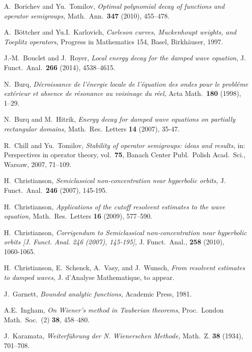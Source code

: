 \documentclass[11pt]{amsart}
\theoremstyle{definition}
\theoremstyle{remark}
\numberwithin{equation}{section}
\begin{document}
\begin{thebibliography}{100}
 A.~Borichev and Yu.~Tomilov, \emph{Optimal polynomial decay of functions and operator semigroups,} Math.\ Ann.\ \textbf{347} (2010), 455--478.

 A.~B\"ottcher and Yu.I.~Karlovich, \emph{Carleson curves, Muckenhoupt weights, and Toeplitz operators,}
Progress in Mathematics 154, Basel, Birkh\"auser, 1997.

 J.-M.~Bouclet and J.~Royer, \emph{Local energy decay for the damped wave equation}, J. Funct.\ Anal.\ \textbf{266} (2014), 4538--4615.

 N.~Burq, \emph{D\'ecroissance de l'\'energie locale de l'\'equation des ondes pour le probl\'eme ext\'erieur et absence de r\'esonance
au voisinage du r\'eel,} Acta Math.\ \textbf{180} (1998), 1--29.

 N.~Burq and M.~Hitrik, \emph{Energy decay for damped wave equations on partially rectangular domains,} Math.\ Res.\ Letters \textbf{14} (2007), 35-47.

 R.~Chill and Yu.~Tomilov, \emph{Stability of operator semigroups: ideas and results,} in: Perspectives in operator theory, vol.\ \textbf{75}, Banach Center
Publ.\ Polish Acad.\ Sci., Warsaw, 2007, 71--109.

 H.~Christianson, \emph{Semiclassical non-concentration near hyperbolic orbits,} J. Funct.\ Anal.\ \textbf{246} (2007), 145-195.

 H.~Christianson, \emph{Applications of the cutoff resolvent estimates to the wave equation,} Math.\ Res.\ Letters \textbf{16} (2009), 577--590.

 H.~Christianson, \emph{Corrigendum to Semiclassical non-concentration near hyperbolic orbits [J. Funct. Anal. 246 (2007), 145-195],}
J. Funct.\ Anal., \textbf{258} (2010), 1060-1065.

 H.~Christianson, E.~Schenck, A.~Vasy, and J.~Wunsch, \emph{From resolvent estimates to damped waves,} J. d'Analyse Mathematique, to appear.

 J.~Garnett, \emph{Bounded analytic functions,} Academic Press, 1981.

 A.E.~Ingham, \emph{On Wiener's method in Tauberian theorems}, Proc.\ London Math.\ Soc.\ (2) \textbf{38}, 458--480.

 J.~Karamata, \emph{Weiterf\"uhrung der N. Wienerschen Methode,} Math.\ Z. \textbf{38} (1934), 701--708.


\end{thebibliography}
\end{document}
